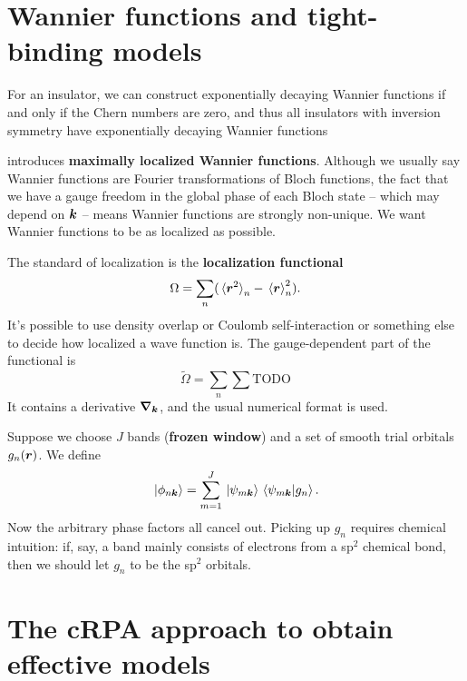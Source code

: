 \documentclass[hyperref, a4paper, 12pt]{report}
\newcommand*{\concept}[1]{{\textbf{#1}}}
\begin{document}
\section{Wannier functions and tight-binding models}

For an insulator,
we can construct exponentially decaying Wannier functions 
if and only if the Chern numbers are zero, 
and thus all insulators with inversion symmetry 
have exponentially decaying Wannier functions \cite{brouder2007exponential}

\cite{marzari2012maximally} introduces \concept{maximally localized Wannier functions}.
Although we usually say Wannier functions are Fourier transformations of Bloch functions,
the fact that we have a gauge freedom in the global phase of each Bloch state
-- which may depend on $\vb*{k}$ --  
means Wannier functions are strongly non-unique.
We want Wannier functions to be as localized as possible. 

The standard of localization is the \concept{localization functional}
\begin{equation}
    \Omega = \sum_n (\expval*{\vb*{r}^2}_n - \expval*{\vb*{r}}_n^2).
\end{equation}
It's possible to use density overlap or Coulomb self-interaction 
or something else 
to decide how localized a wave function is. 
The gauge-dependent part of the functional 
is 
\begin{equation}
    \tilde{\Omega} = \sum_n \sum_{} \text{TODO}
\end{equation}
It contains a derivative $\grad_{\vb*{k}}$,
and the usual numerical format is used. 


Suppose we choose $J$ bands (\concept{frozen window}) and a set of smooth trial orbitals $g_n(\vb*{r})$.
We define 
\begin{equation}
    \ket*{\phi_{n \vb*{k}}} = \sum_{m = 1}^J \ket*{\psi_{m \vb*{k}}} \braket*{\psi_{m \vb*{k}}}{g_n}.
\end{equation}
Now the arbitrary phase factors all cancel out. 
Picking up $g_n$ requires chemical intuition: 
if, say, a band mainly consists of electrons from a sp$^2$ chemical bond, 
then we should let $g_n$ to be the sp$^2$ orbitals. 

\section{The cRPA approach to obtain effective models}
\end{document}
